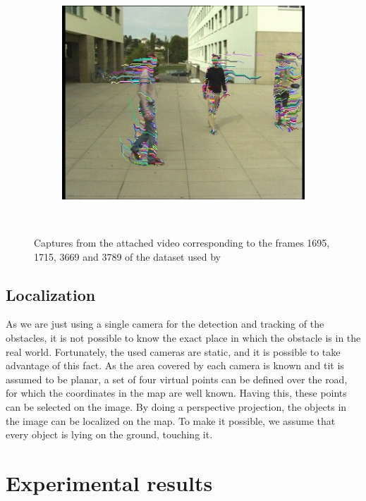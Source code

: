 \begin{figure}[t]
        ~
        \begin{subfigure}[b]{0.24\textwidth}
                \centering
                \caption{~}
                \includegraphics[width=\textwidth, trim=6 0 5 1, clip]{fig8.jpg}
                \label{fig:cp02_videoCapture4}
        \end{subfigure}%
        \caption{Captures from the attached video corresponding to the frames 1695, 1715, 3669 and 3789 of the dataset used by \cite{berclaz2011multiple}}\label{fig:cp02_videoCaptures}
\end{figure}

\subsection{Localization}\label{ch:chapter02_01_03}

As we are just using a single camera for the detection and tracking of the obstacles, it is not possible to know the exact place in which the obstacle is in the real world. Fortunately, the used cameras are static, and it is possible to take advantage of this fact. As the area covered by each camera is known and tit is assumed to be planar, a set of four virtual points can be defined over the road, for which the coordinates in the map are well known.
Having this, these points can be selected on the image. By doing a perspective projection, the objects in the image can be localized on the map. To make it possible, we assume that every object is lying on the ground, touching it.

\section{Experimental results}\label{ch:chapter02_02}

